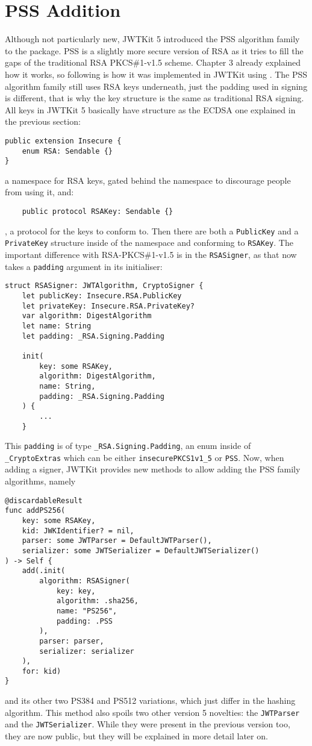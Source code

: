 \section{PSS Addition}
Although not particularly new, JWTKit 5 introduced the PSS algorithm family to the package. PSS is a slightly more secure version of RSA as it tries to fill the gaps of the traditional RSA PKCS\#1-v1.5 scheme. Chapter 3 already explained how it works, so following is how it was implemented in JWTKit using .
The PSS algorithm family still uses RSA keys underneath, just the padding used in signing is different, that is why the key structure is the same as traditional RSA signing. All keys in JWTKit 5 basically have structure as the ECDSA one explained in the previous section:
\begin{verbatim}
public extension Insecure {
    enum RSA: Sendable {}
}
\end{verbatim}
a namespace for RSA keys, gated behind the  namespace to discourage people from using it, and:
\begin{verbatim}
    public protocol RSAKey: Sendable {}
\end{verbatim}
, a protocol for the keys to conform to.
Then there are both a \lstinline{PublicKey} and a \lstinline{PrivateKey} structure inside of the namespace and conforming to \lstinline{RSAKey}. 
The important difference with RSA-PKCS\#1-v1.5 is in the \lstinline{RSASigner}, as that now takes a \lstinline{padding} argument in its initialiser:
\begin{verbatim}
struct RSASigner: JWTAlgorithm, CryptoSigner {
    let publicKey: Insecure.RSA.PublicKey
    let privateKey: Insecure.RSA.PrivateKey?
    var algorithm: DigestAlgorithm
    let name: String
    let padding: _RSA.Signing.Padding

    init(
        key: some RSAKey, 
        algorithm: DigestAlgorithm, 
        name: String, 
        padding: _RSA.Signing.Padding
    ) {
        ...
    }
\end{verbatim}
This \lstinline{padding} is of type \lstinline{_RSA.Signing.Padding}, an enum inside of \lstinline{_CryptoExtras} which can be either \lstinline{insecurePKCS1v1_5} or \lstinline{PSS}. Now, when adding a signer, JWTKit provides new methods to allow adding the PSS family algorithms, namely
\begin{verbatim}
@discardableResult
func addPS256(
    key: some RSAKey,
    kid: JWKIdentifier? = nil,
    parser: some JWTParser = DefaultJWTParser(),
    serializer: some JWTSerializer = DefaultJWTSerializer()
) -> Self {
    add(.init(
        algorithm: RSASigner(
            key: key, 
            algorithm: .sha256, 
            name: "PS256", 
            padding: .PSS
        ),
        parser: parser,
        serializer: serializer
    ),
    for: kid)
}
\end{verbatim}
and its other two PS384 and PS512 variations, which just differ in the hashing algorithm.
This method also spoils two other version 5 novelties: the \lstinline{JWTParser} and the \lstinline{JWTSerializer}. While they were present in the previous version too, they are now public, but they will be explained in more detail later on.

